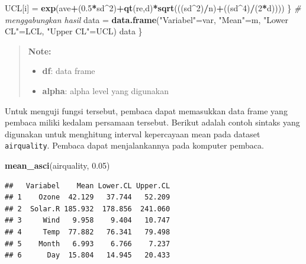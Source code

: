 \documentclass[]{book}
\newenvironment{Shaded}{\begin{snugshade}}{\end{snugshade}}
\newcommand{\KeywordTok}[1]{\textcolor[rgb]{0.13,0.29,0.53}{\textbf{#1}}}
\newcommand{\DecValTok}[1]{\textcolor[rgb]{0.00,0.00,0.81}{#1}}
\newcommand{\FloatTok}[1]{\textcolor[rgb]{0.00,0.00,0.81}{#1}}
\newcommand{\StringTok}[1]{\textcolor[rgb]{0.31,0.60,0.02}{#1}}
\newcommand{\CommentTok}[1]{\textcolor[rgb]{0.56,0.35,0.01}{\textit{#1}}}
\newcommand{\OperatorTok}[1]{\textcolor[rgb]{0.81,0.36,0.00}{\textbf{#1}}}
\newcommand{\NormalTok}[1]{#1}
\providecommand{\tightlist}{%
  \setlength{\itemsep}{0pt}\setlength{\parskip}{0pt}}
\begin{document}
\begin{Shaded}
\begin{Highlighting}[]
\NormalTok{    UCL[i] =}\StringTok{ }\KeywordTok{exp}\NormalTok{(ave}\OperatorTok{+}\NormalTok{(}\FloatTok{0.5}\OperatorTok{*}\NormalTok{sd}\OperatorTok{^}\DecValTok{2}\NormalTok{)}\OperatorTok{+}\KeywordTok{qt}\NormalTok{(re,d)}\OperatorTok{*}\KeywordTok{sqrt}\NormalTok{(((sd}\OperatorTok{^}\DecValTok{2}\NormalTok{)}\OperatorTok{/}\NormalTok{n)}\OperatorTok{+}\NormalTok{((sd}\OperatorTok{^}\DecValTok{4}\NormalTok{)}\OperatorTok{/}\NormalTok{(}\DecValTok{2}\OperatorTok{*}\NormalTok{d))))}
\NormalTok{  \}}
  \CommentTok{# menggabungkan hasil}
\NormalTok{  data =}\StringTok{ }\KeywordTok{data.frame}\NormalTok{(}\StringTok{"Variabel"}\NormalTok{=var,}
                    \StringTok{"Mean"}\NormalTok{=m,}
                    \StringTok{"Lower CL"}\NormalTok{=LCL,}
                    \StringTok{"Upper CL"}\NormalTok{=UCL)}
\NormalTok{  data}
\NormalTok{\}}
\end{Highlighting}
\end{Shaded}

\begin{quote}
\textbf{Note: }

\begin{itemize}
\tightlist
\item
  \textbf{df}: data frame
\item
  \textbf{alpha}: alpha level yang digunakan
\end{itemize}
\end{quote}

Untuk menguji fungsi tersebut, pembaca dapat memasukkan data frame yang
pembaca miliki kedalam persamaan tersebut. Berikut adalah contoh sintaks
yang digunakan untuk menghitung interval kepercayaan mean pada dataset
\texttt{airquality}. Pembaca dapat menjalankannya pada komputer pembaca.

\begin{Shaded}
\begin{Highlighting}[]
\KeywordTok{mean_asci}\NormalTok{(airquality, }\FloatTok{0.05}\NormalTok{)}
\end{Highlighting}
\end{Shaded}

\begin{verbatim}
##   Variabel    Mean Lower.CL Upper.CL
## 1    Ozone  42.129   37.744   52.209
## 2  Solar.R 185.932  178.856  241.060
## 3     Wind   9.958    9.404   10.747
## 4     Temp  77.882   76.341   79.498
## 5    Month   6.993    6.766    7.237
## 6      Day  15.804   14.945   20.433
\end{verbatim}
\end{document}
